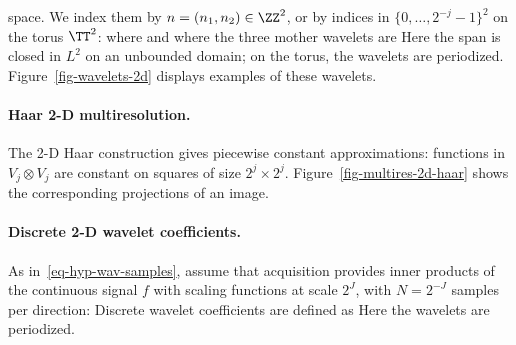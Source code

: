 space. We index them by $n=(n_1,n_2)\in\ZZ^2$, or by indices in $\{0,\ldots,2^{-j}-1\}^2$ on the torus $\TT^2$:
where
and where the three mother wavelets are
Here the span is closed in $L^2$ on an unbounded domain; on the torus, the wavelets are periodized. Figure~\ref{fig-wavelets-2d} displays examples of these wavelets.



  
\paragraph{Haar 2-D multiresolution.}

The 2-D Haar construction gives piecewise constant approximations: functions in $V_j \otimes V_j$ are constant on squares of size $2^j \times 2^j$. Figure~\ref{fig-multires-2d-haar} shows the corresponding projections of an image.


  
\paragraph{Discrete 2-D wavelet coefficients.}

As in~\eqref{eq-hyp-wav-samples}, assume that acquisition provides inner products of the continuous signal $f$ with scaling functions at scale $2^J$, with $N=2^{-J}$ samples per direction:
Discrete wavelet coefficients are defined as
Here the wavelets are periodized.
 
